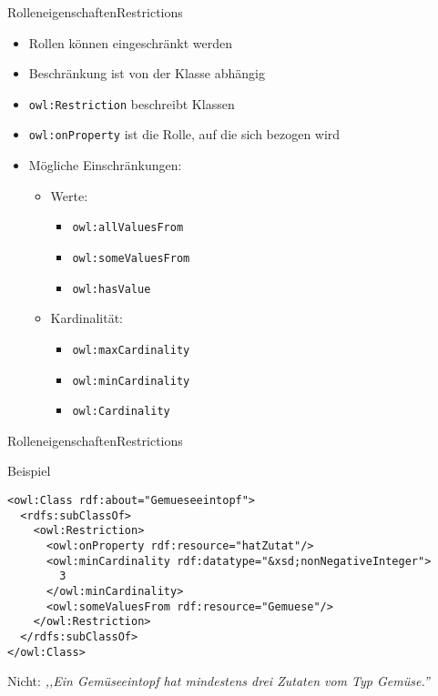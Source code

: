 \documentclass{beamer}
\begin{document}
\begin{frame}[fragile]{Rolleneigenschaften}{Restrictions}
\begin{itemize}
\item Rollen können eingeschränkt werden
\item Beschränkung ist von der Klasse abhängig
\item \texttt{owl:Restriction} beschreibt Klassen
\item \texttt{owl:onProperty} ist die Rolle, auf die sich bezogen wird
\item Mögliche Einschränkungen:
\begin{itemize}
\item Werte:
\begin{itemize}
\item \texttt{owl:allValuesFrom}
\item \texttt{owl:someValuesFrom}
\item \texttt{owl:hasValue}
\end{itemize}
\item Kardinalität:
\begin{itemize}
\item \texttt{owl:maxCardinality}
\item \texttt{owl:minCardinality}
\item \texttt{owl:Cardinality}
\end{itemize}

\end{itemize}

\end{itemize}


\end{frame}
%

\begin{frame}[fragile]{Rolleneigenschaften}{Restrictions}
\begin{exampleblock}{Beispiel}
\begin{lstlisting}[lang="xml"]
<owl:Class rdf:about="Gemueseeintopf">
  <rdfs:subClassOf>
    <owl:Restriction>
      <owl:onProperty rdf:resource="hatZutat"/>
      <owl:minCardinality rdf:datatype="&xsd;nonNegativeInteger">
        3
      </owl:minCardinality>
      <owl:someValuesFrom rdf:resource="Gemuese"/>
    </owl:Restriction>
  </rdfs:subClassOf>
</owl:Class>
\end{lstlisting}
\alert{Nicht:} \emph{,,Ein Gemüseeintopf hat mindestens drei
Zutaten vom Typ Gemüse.''}
\end{exampleblock}
\end{frame}
\end{document}
